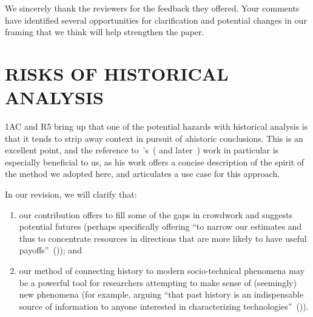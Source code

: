 \documentclass[11pt]{article}
\begin{document}
We sincerely thank the reviewers for the feedback they offered. Your comments have identified several opportunities for clarification and potential changes in our framing that we think will help strengthen the paper.

\section*{RISKS OF HISTORICAL ANALYSIS}
1AC and R5 bring up that one of the potential hazards with
historical analysis is that
it tends to strip away context in pursuit of ahistoric conclusions.
This is an excellent point, and
the reference to~\citeauthor{rosenberg1994exploring}'s~(\citeyear{rosenberg1994exploring}
and later~\citeyear{rosenberg1994exploring})
work in particular is especially beneficial to us, as his work
offers a concise description of the spirit of the method we adopted here,
and articulates a use case for this approach.

In our revision, we will clarify that:
\begin{enumerate}
  \item our contribution offers to fill some of the gaps in crowdwork and suggests potential futures
        (perhaps specifically offering
            ``to narrow our estimates
              and thus to concentrate resources
              in directions that are more likely to have useful payoffs''~(\cite{rosenberg1994exploring}));
  and
  \item our method of connecting history to modern socio-technical phenomena may be
        a powerful tool for researchers attempting
        to make sense of (seemingly) new phenomena
        (for example,
        arguing ``that past history is
                  an indispensable source of information
                  to anyone interested in characterizing technologies''~(\cite{rosenberg1982inside})).
\end{enumerate}


\end{document}
